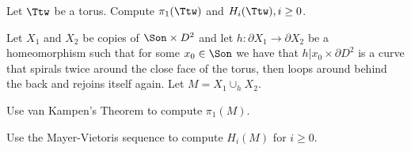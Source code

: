 \begin{alist}
\item Let $\Ttw$ be a torus. Compute $\pi_1(\Ttw)$ and $H_i(\Ttw),
i\geq 0$.
\item Let $X_1$ and $X_2$ be copies of $\Son\times D^2$ and let
$h:\partial X_1\rightarrow \partial X_2$ be a homeomorphism such that
for some $x_0\in \Son$ we have that $h|{x_0\times \partial D^2}$ is a
curve that spirals twice around the close face of the torus, then
loops around behind the back and rejoins itself again. Let $M=X_1
\cup_h X_2$.
\begin{rlist}
\item Use van Kampen's Theorem to compute $\pi_1(M)$.
\item Use the Mayer-Vietoris sequence to compute $H_i(M)$ for $i\geq
0$.
\end{rlist}
\end{alist}
